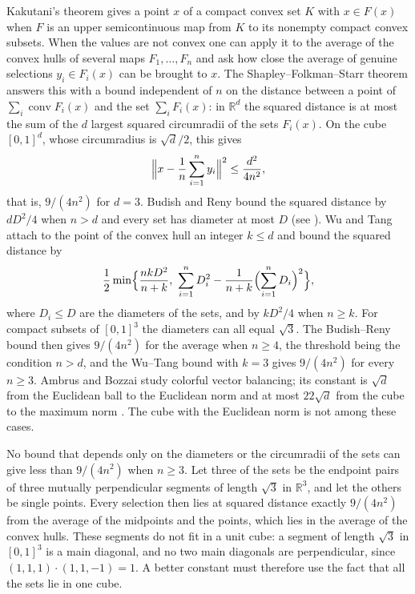 \documentclass[11pt]{amsart}
\theoremstyle{remark}
\numberwithin{equation}{section}
\DeclareMathOperator{\conv}{conv}
\begin{document}
Kakutani's theorem \cite{Kakutani41} gives a point $x$ of a compact convex set $K$ with $x\in F(x)$ when $F$ is an upper semicontinuous map from $K$ to its nonempty compact convex subsets. When the values are not convex one can apply it to the average of the convex hulls of several maps $F_1,\dots,F_n$ and ask how close the average of genuine selections $y_i\in F_i(x)$ can be brought to $x$. The Shapley--Folkman--Starr theorem \cite{Starr69} answers this with a bound independent of $n$ on the distance between a point of $\sum_i\conv F_i(x)$ and the set $\sum_iF_i(x)$: in $\mathbb R^d$ the squared distance is at most the sum of the $d$ largest squared circumradii of the sets $F_i(x)$. On the cube $[0,1]^d$, whose circumradius is $\sqrt d/2$, this gives
\[
\Bigl\|x-\frac1n\sum_{i=1}^n y_i\Bigr\|^2\le\frac{d^2}{4n^2},
\]
that is, $9/(4n^2)$ for $d=3$. Budish and Reny \cite{BudishReny20} bound the squared distance by $dD^2/4$ when $n>d$ and every set has diameter at most $D$ (see \cite[Corollary~1.5]{WuTang24}). Wu and Tang \cite[Theorem~2.1 and Corollary~2.2]{WuTang24} attach to the point of the convex hull an integer $k\le d$ and bound the squared distance by
\[
\frac12\min\Bigl\{\frac{nkD^2}{n+k},\ \sum_{i=1}^nD_i^2-\frac1{n+k}\Bigl(\sum_{i=1}^nD_i\Bigr)^2\Bigr\},
\]
where $D_i\le D$ are the diameters of the sets, and by $kD^2/4$ when $n\ge k$. For compact subsets of $[0,1]^3$ the diameters can all equal $\sqrt3$. The Budish--Reny bound then gives $9/(4n^2)$ for the average when $n\ge4$, the threshold being the condition $n>d$, and the Wu--Tang bound with $k=3$ gives $9/(4n^2)$ for every $n\ge3$. Ambrus and Bozzai \cite{AmbrusBozzai} study colorful vector balancing; its constant is $\sqrt d$ from the Euclidean ball to the Euclidean norm and at most $22\sqrt d$ from the cube to the maximum norm \cite[Theorems~1.4 and~1.5]{AmbrusBozzai}. The cube with the Euclidean norm is not among these cases.

No bound that depends only on the diameters or the circumradii of the sets can give less than $9/(4n^2)$ when $n\ge3$. Let three of the sets be the endpoint pairs of three mutually perpendicular segments of length $\sqrt3$ in $\mathbb R^3$, and let the others be single points. Every selection then lies at squared distance exactly $9/(4n^2)$ from the average of the midpoints and the points, which lies in the average of the convex hulls. These segments do not fit in a unit cube: a segment of length $\sqrt3$ in $[0,1]^3$ is a main diagonal, and no two main diagonals are perpendicular, since $(1,1,1)\cdot(1,1,-1)=1$. A better constant must therefore use the fact that all the sets lie in one cube.
\end{document}
